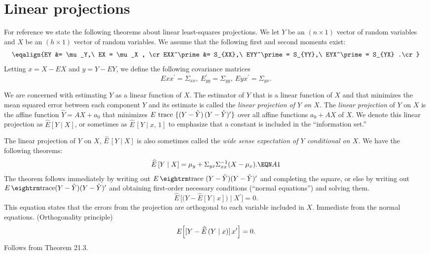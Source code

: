 

%

%
%
\def\cov{\mathop{\rm cov}\nolimits} \overfullrule=0pt
%
%
\section{Linear projections} %

For reference we state the following theorems about linear least-squares
projections.  We let $Y$ be an $(n \times 1)$ vector of random variables and
$X$ be an $(h \times 1)$ vector of random variables.  We assume that the
following first and second moments exist:
$$\eqalign{EY &= \mu_Y,\ EX = \mu_X , \cr
EXX^\prime &= S_{XX},\ EYY^\prime = S_{YY},\ EYX^\prime = S_{YX} .\cr}$$
Letting $x=X - EX$ and $y = Y - EY$, we define the following covariance matrices
$$Exx^\prime = \Sigma_{xx},\ E_{yy}^\prime = \Sigma_{yy},\ Eyx^\prime =
\Sigma_{yx}.$$

We are concerned with estimating $Y$ as a linear function of $X$.  The
estimator of $Y$ that is a linear function of $X$ and that minimizes the
mean squared error between each component $Y$ and its estimate is called the
{\it linear projection of $Y$ on $X$.}
\medskip\noindent
 The {\it linear projection\/} of $Y$ on $X$ is the
affine
function $\hat Y = AX + a_0$ that minimizes $E\hbox{ trace } \{(Y-\hat Y)\,
(Y-\hat Y)^\prime\}$ over all affine functions $a_0+AX$ of $X$.  We denote
this linear
projection as $\widehat E [Y \mid X]$, or sometimes as $\widehat E\, [Y\mid x,
\, 1]$ to emphasize that
a constant is included in the ``information set.''
\enddefinition
\par
The linear projection of $Y$ on $X$, $\widehat E \, [Y \mid X]$ is also
sometimes called the {\it wide sense expectation of $Y$ conditional on $X$.}
We have the following theorems:
\medskip \noindent
$$\widehat E\,[Y \mid X] = \mu_y + \Sigma_{yx} \Sigma^{-1}_{xx} (X-\mu_x) .
\EQN A1$$
\endtheorem
\medskip \noindent
\proof
The theorem follows immediately by writing out $E\, {\rm trace}
\ (Y-\hat Y) (Y - \hat
Y)^\prime$ and completing the square, or else by writing out $E \, {\rm trace}
(Y-\hat Y) (Y - \hat Y)^\prime$ and obtaining first-order necessary conditions
(``normal equations'') and solving them. \endproof %
\medskip \noindent
$$\widehat E\,\biggl[\bigl(Y - \widehat E [Y \mid x]\bigr) \mid X^\prime
\biggr] = 0.$$
\endtheorem
\noindent This equation states that the errors from the projection are orthogonal to each
variable included in $X$.
\medskip\noindent
\proof Immediate from the normal equations.\endproof %
\medskip\noindent
 \quad (Orthogonality principle)
$$E\Bigl[ [Y-\widehat E\,(Y\mid x)]\,x^\prime\Bigr]=0 .$$
\endtheorem
\medskip\noindent
\proof Follows from Theorem 21.3. \endproof %

